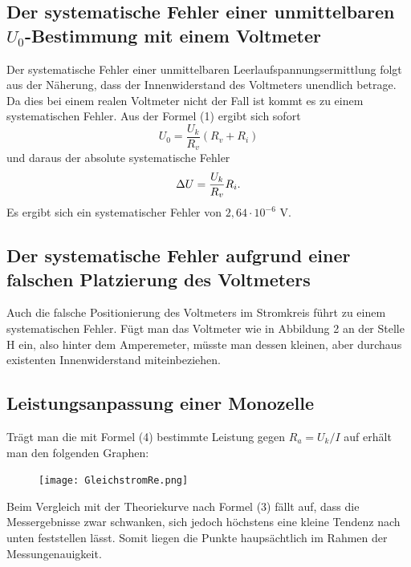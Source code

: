 \subsection{Der systematische Fehler einer unmittelbaren $U_0$-Bestimmung mit einem Voltmeter}
Der systematische Fehler einer unmittelbaren Leerlaufspannungsermittlung folgt aus der Näherung, dass
der Innenwiderstand des Voltmeters unendlich betrage. Da dies bei einem realen Voltmeter nicht der
Fall ist kommt es zu einem systematischen Fehler.
Aus der Formel (1) ergibt sich sofort
\begin{equation}
U_0 = \frac{U_k}{R_v}(R_v + R_i)
\end{equation}
und daraus der absolute systematische Fehler
\begin{equation}
\Delta U = \frac{U_k}{R_v}R_i \text.
\end{equation}
Es ergibt sich ein systematischer Fehler von $2,64 \cdot 10^{-6} $ V.





\subsection{Der systematische Fehler aufgrund einer falschen Platzierung des Voltmeters}
Auch die falsche Positionierung des Voltmeters im Stromkreis führt zu einem
systematischen Fehler. Fügt man das Voltmeter wie in Abbildung 2 an der Stelle H
ein, also hinter dem Amperemeter, müsste man dessen kleinen, aber durchaus existenten
Innenwiderstand miteinbeziehen.

\newpage
\subsection{Leistungsanpassung einer Monozelle}
Trägt man die mit Formel (4) bestimmte Leistung gegen $R_a = U_k/I$ auf erhält man
den folgenden Graphen:
\begin{figure}[H]
	\centering
	\caption{}
	\texttt{[image: GleichstromRe.png]}
	\label{fig:GleichstromLeistung}
\end{figure}
Beim Vergleich mit der Theoriekurve nach Formel (3) fällt auf, dass die Messergebnisse zwar schwanken, sich jedoch höchstens eine kleine Tendenz nach unten feststellen lässt. Somit liegen die Punkte haupsächtlich im Rahmen der Messungenauigkeit.
